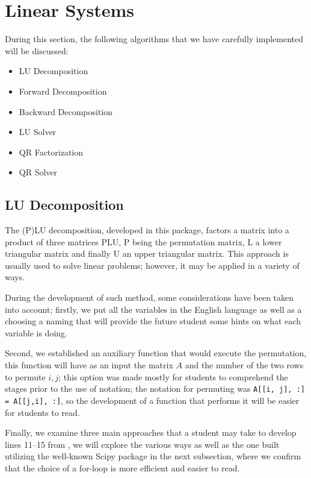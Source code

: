 \section{Linear Systems}
During this section, the following algorithms that we have carefully implemented will be discussed:
\begin{itemize}
    \item LU Decomposition  
    \item Forward Decomposition 
    \item Backward Decomposition 
    \item LU Solver 
    \item QR Factorization 
    \item QR Solver 
\end{itemize}

\subsection{LU Decomposition}
The (P)LU decomposition, developed in this package, factors a matrix into a product of three matrices PLU, P being the permutation matrix, L a lower triangular matrix and finally U an upper triangular matrix. This approach is usually used to solve linear problems; however, it may be applied in a variety of ways.

During the development of such method, some considerations have been taken into account; firstly, we put all the variables in the English language as well as a choosing a naming that will provide the future student some hints on what each variable is doing. 

Second, we established an auxiliary function that would execute the permutation, this function will have as an input the matrix $A$ and the number of the two rows to permute $i,j$; this option was made mostly for students to comprehend the stages prior to the use of notation; the notation for permuting was \lstinline|A[[i, j], :] = A[[j,i], :]|, so the development of a function that performs it will be easier for students to read.

Finally, we examine three main approaches that a student may take to develop lines 11–15 from , we will explore the various ways as well as the one built utilizing the well-known Scipy package in the next subsection, where we confirm that the choice of a for-loop is more efficient and easier to read.

